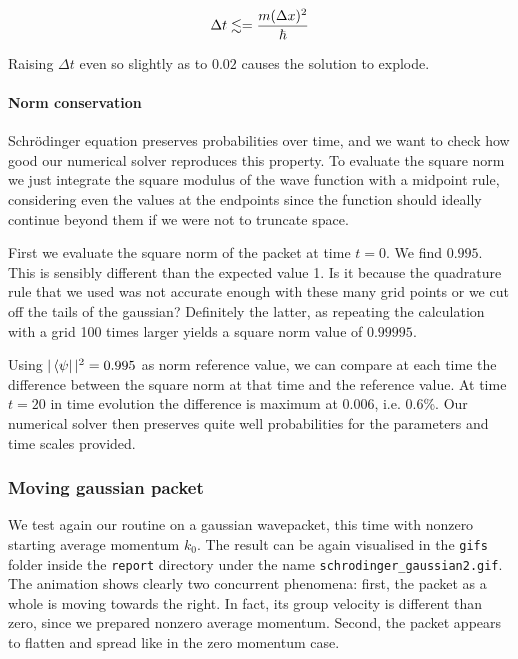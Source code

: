 \documentclass[a4paper,11]{article}
\newcommand{\mdcode}[1]{\lstinline[backgroundcolor=\color{gray!10}, frame=single, frameround=tttt]|#1|}
\begin{document}
\[
	\Delta t \lesssim = {m(\Delta x)^2\over \hbar}
\]

Raising $\Delta t$ even so slightly as to $0.02$ causes the solution to 
explode.


\paragraph{Norm conservation}

Schrödinger equation preserves probabilities over time, and we want to check
how good our numerical solver reproduces this property.
To evaluate the square norm we just integrate the square modulus of the
wave function with a midpoint rule, considering even the values at the endpoints
since the function should ideally continue beyond them if we were not to 
truncate space.

First we evaluate the square norm of the packet at time $t = 0$. 
We find $0.995$. This is sensibly different than the expected value 1.
Is it because the quadrature rule that we used was not accurate enough with 
these many grid points or we cut off the tails of the gaussian? Definitely the 
latter, as repeating the calculation with a grid 100 times larger yields 
a square norm value of $0.99995$.

Using $|\bra{\psi}|^{2} = 0.995$ as norm reference value, we can compare at 
each time the difference between the square norm at that time and the
reference value. At time $t = 20$ in time evolution the difference is maximum
at 0.006, i.e. 0.6\%. Our numerical solver then preserves quite well
probabilities for the parameters and time scales provided.

\subsubsection{Moving gaussian packet}

We test again our routine on a gaussian wavepacket, this time with nonzero
starting average momentum $k_{0}$. The result can be again visualised in the 
\mdcode{gifs} folder inside the \mdcode{report} directory under the name
\mdcode{schrodinger_gaussian2.gif}.
The animation shows clearly two concurrent phenomena: first, the packet as a 
whole is moving towards the right. In fact, its group velocity is different 
than zero,
since we prepared nonzero average momentum. Second, the packet appears 
to flatten and spread like in the zero momentum case.
\end{document}
